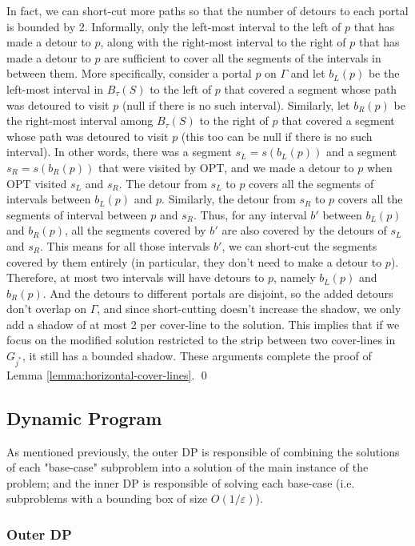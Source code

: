 \documentclass[pdflatex,sn-mathphys-num]{sn-jnl}
\theoremstyle{thmstyleone}
\newcommand{\eps}{\varepsilon}
\newcommand{\OPT}{{\text{OPT}}}
\begin{document}
In fact, we can short-cut more paths so that the number of detours to each portal is bounded by 2. Informally, only the left-most interval to the left of $p$ that has made a detour to $p$, along with the right-most interval to the right of $p$ that has made a detour to $p$ are sufficient to cover all the segments of the intervals in between them. More specifically, consider a portal $p$ on $\Gamma$ and let $b_L(p)$ be the left-most interval in $B_\tau(S)$ to the left of $p$ that covered a segment whose path was detoured to visit $p$ (null if there is no such interval). Similarly, let $b_R(p)$ be the right-most interval among $B_\tau(S)$ to the right of $p$ that covered a segment whose path was detoured to visit $p$ (this too can be  null if there is no such interval).
 In other words, there was a segment $s_L=s(b_L(p))$ and a segment $s_R=s(b_R(p))$ that
 were visited by $\OPT$, and we made a detour to $p$ when $\OPT$ visited $s_L$ and $s_R$. The detour from $s_L$ to $p$ covers all the segments of intervals between $b_L(p)$ and $p$. Similarly, the detour from $s_R$ to $p$ covers all the segments of interval between $p$ and $s_R$.
 Thus, for any interval $b'$ between $b_L(p)$ and $b_R(p)$, all the segments covered by $b'$ are also covered by the detours of $s_L$ and $s_R$. This means for
 all those intervals $b'$, we can short-cut the segments covered by them entirely (in particular, they don't need to make a detour to $p$). 
 Therefore, at most two intervals will have detours to $p$, namely $b_L(p)$
 and $b_R(p)$. And the detours to different portals are disjoint,
 so the added detours don't overlap on $\Gamma$, and since short-cutting doesn't increase the shadow, we only add a shadow of at most 2 per cover-line to the solution. This implies that if we focus on the modified solution restricted to the strip between two cover-lines in $G_{j^*}$, it still has a bounded shadow.
These arguments complete the proof of Lemma \ref{lemma:horizontal-cover-lines}. \qed

\subsection{Dynamic Program}\label{sec:DP}
As mentioned previously, the outer DP is responsible of combining the solutions of each "base-case" subproblem into a solution of the main instance of the problem; and the inner DP is responsible of solving each base-case (i.e. subproblems with a bounding box of size $O(1/\eps)$).

\subsubsection{Outer DP}\label{sec:outer-dp}
\end{document}
